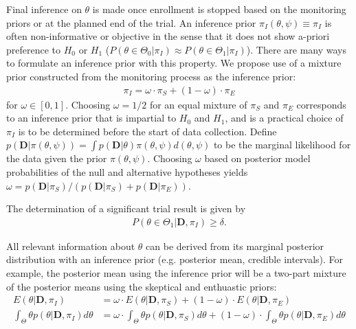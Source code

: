 \documentclass[12pt]{article}
\begin{document}


Final inference on $\theta$ is made once enrollment is stopped based on the monitoring priors or at the planned end of the trial. An inference prior $\pi_{I}(\theta,\psi)\equiv\pi_{I}$ is often non-informative or objective in the sense that it does not show a-priori preference to $H_0$ or $H_1$ ($P(\theta\in\Theta_0|\pi_I)\approx P(\theta\in\Theta_1|\pi_I)$). There are many ways to formulate an inference prior with this property. We propose use of a mixture prior constructed from the monitoring process as the inference prior:
\begin{align*}
\pi_{I}=\omega\cdot\pi_{S}+(1-\omega)\cdot\pi_E
\end{align*}
for $\omega\in[0,1]$. Choosing $\omega=1/2$ for an equal mixture of $\pi_S$ and $\pi_E$ corresponds to an inference prior that is impartial to $H_0$ and $H_1$, and is a practical choice of $\pi_I$ is to be determined before the start of data collection. Define $p(\mathbf{D}|\pi(\theta,\psi))=\int p(\mathbf{D}|\theta)\pi(\theta,\psi)d(\theta,\psi)$ to be the marginal likelihood for the data given the prior $\pi(\theta,\psi)$. Choosing $\omega$ based on posterior model probabilities of the null and alternative hypotheses yields $\omega=p(\mathbf{D}| \pi_{S})/(p(\mathbf{D}| \pi_{S})+p(\mathbf{D}| \pi_{E}))$. 

The determination of a significant trial result is given by
\begin{align*}
P(\theta\in\Theta_1|\mathbf{D},\pi_I)\geq\delta.
\end{align*} 

All relevant information about $\theta$ can be derived from its marginal posterior distribution with an inference prior (e.g. posterior mean, credible intervals). For example, the posterior mean using the inference prior will be a two-part mixture of the posterior means using the skeptical and enthuastic priors:
\begin{align*}
E(\theta|\mathbf{D},\pi_I)&=\omega\cdot E(\theta|\mathbf{D}, \pi_{S})+(1-\omega)\cdot E(\theta|\mathbf{D}, \pi_{E})\\
\int_\Theta \theta p(\theta|\mathbf{D},\pi_{I})d\theta&=\omega\cdot \int_\Theta \theta p(\theta|\mathbf{D},\pi_{S})d\theta+(1-\omega)\cdot\int_\Theta \theta p(\theta|\mathbf{D},\pi_{E})d\theta
\end{align*}
\end{document}

